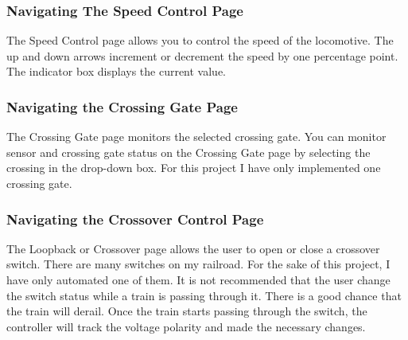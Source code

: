 \documentclass[acmlarge,screen]{acmart}
\begin{document}
\subsubsection{Navigating The Speed Control Page}
The Speed Control page allows you to control the speed of the locomotive. The up and down arrows increment or decrement the speed by one percentage point. The indicator box displays the current value.
\subsubsection{Navigating the Crossing Gate Page}
The Crossing Gate page monitors the selected crossing gate. You can monitor sensor and crossing gate status on the Crossing Gate page by selecting the crossing in the drop-down box. For this project I have only implemented one crossing gate.
\subsubsection{Navigating the Crossover Control Page}
The Loopback or Crossover page allows the user to open or close a crossover switch. There are many switches on my railroad. For the sake of this project, I have only automated one of them. It is not recommended that the user change the switch status while a train is passing through it. There is a good chance that the train will derail. Once the train starts passing through the switch, the controller will track the voltage polarity and made the necessary changes.
\end{document}

